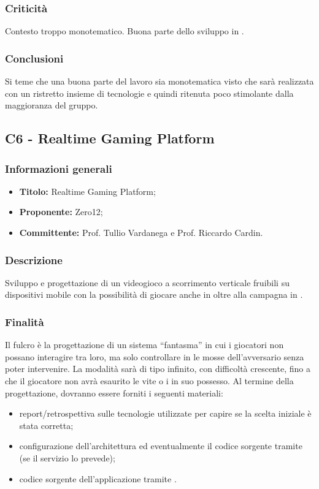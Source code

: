 \documentclass[]{article}
\begin{document}
		\subsubsection{Criticità}
		Contesto troppo monotematico. Buona parte dello sviluppo in .

		\subsubsection{Conclusioni}
		Si teme che una buona parte del lavoro sia monotematica visto che sarà realizzata con un ristretto insieme di tecnologie e quindi ritenuta poco stimolante dalla maggioranza del gruppo.

		\newpage


        \subsection{C6 - Realtime Gaming Platform }
		\subsubsection{Informazioni generali}
		\begin{itemize}
			\item \textbf{Titolo:} Realtime Gaming Platform;
			\item \textbf{Proponente:} Zero12;
			\item \textbf{Committente:} Prof. Tullio Vardanega e Prof. Riccardo Cardin.
		\end{itemize}

		\subsubsection{Descrizione}
		Sviluppo e progettazione di un videogioco a scorrimento verticale fruibili su dispositivi mobile con la possibilità di giocare anche in  oltre alla campagna in .

		\subsubsection{Finalità}
		Il fulcro è la progettazione di un sistema  “fantasma” in cui i giocatori non possano interagire tra loro, ma solo controllare in  le mosse dell'avversario senza poter intervenire.
		La modalità  sarà di tipo infinito, con difficoltà crescente, fino a che il giocatore non avrà esaurito le vite o i  in suo possesso.
		Al termine della progettazione, dovranno essere forniti i seguenti materiali:
		\begin{itemize}
			\item report/retrospettiva sulle tecnologie utilizzate per capire se la scelta iniziale è stata corretta;
			\item configurazione dell'architettura  ed eventualmente il codice sorgente tramite  (se il servizio lo prevede);
			\item codice sorgente dell'applicazione tramite  .
		\end{itemize}
\end{document}
